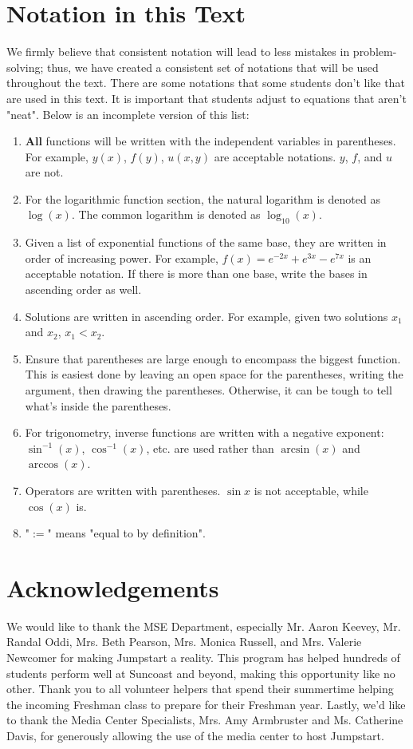 \documentclass[../book.tex]{subfiles}
\begin{document}
\section{Notation in this Text}
We firmly believe that consistent notation will lead to less mistakes in problem-solving; thus, we have created a consistent set of notations that will be used throughout the text.  There are some notations that some students don't like that are used in this text.  It is important that students adjust to equations that aren't "neat".  Below is an incomplete version of this list: \begin{enumerate}
    \item \textbf{All} functions will be written with the independent variables in parentheses.  For example, $y(x)$, $f(y)$, $u(x,y)$ are acceptable notations.  $y$, $f$, and $u$ are not.
    \item For the logarithmic function section, the natural logarithm is denoted as $\log(x)$.  The common logarithm is denoted as $\log_{10}(x)$.
    \item Given a list of exponential functions of the same base, they are written in order of increasing power.  For example, $f(x)=e^{-2x}+e^{3x}-e^{7x}$ is an acceptable notation.  If there is more than one base, write the bases in ascending order as well.
    \item Solutions are written in ascending order.  For example, given two solutions $x_1$ and $x_2$, $x_1<x_2$.
    \item Ensure that parentheses are large enough to encompass the biggest function.  This is easiest done by leaving an open space for the parentheses, writing the argument, then drawing the parentheses.  Otherwise, it can be tough to tell what's inside the parentheses.
    \item For trigonometry, inverse functions are written with a negative exponent: $\sin^{-1}(x)$, $\cos^{-1}(x)$, etc.  are used rather than $\arcsin(x)$ and $\arccos(x)$.
    \item Operators are written with parentheses.  $\sin x$ is not acceptable, while $\cos(x)$ is.
    \item "$:=$" means "equal to by definition".
\end{enumerate}

\section{Acknowledgements}
We would like to thank the MSE Department, especially Mr$.$ Aaron Keevey, Mr$.$ Randal Oddi, Mrs$.$ Beth Pearson, Mrs$.$ Monica Russell, and Mrs$.$ Valerie Newcomer for making Jumpstart a reality.  This program has helped hundreds of students perform well at Suncoast and beyond, making this opportunity like no other.  Thank you to all volunteer helpers that spend their summertime helping the incoming Freshman class to prepare for their Freshman year.  Lastly, we'd like to thank the Media Center Specialists, Mrs$.$ Amy Armbruster and Ms$.$ Catherine Davis, for generously allowing the use of the media center to host Jumpstart.
\end{document}
